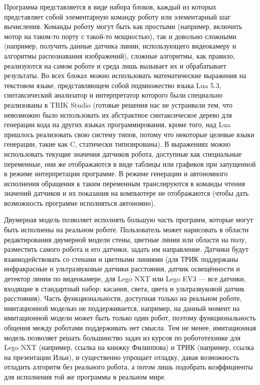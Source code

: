 ﻿\documentclass[conference]{IEEEtran}
\begin{document}
Программа представляется в виде набора блоков, каждый из которых представляет собой 
элементарную команду роботу или элементарный шаг вычисления. Команды роботу могут 
быть как простыми (например, включить мотор на таком-то порту с такой-то мощностью), 
так и довольно сложными (например, получить данные датчика линии, использующего видеокамеру 
и алгоритмы распознавания изображений), сложные алгоритмы, как правило, реализуются 
на самом роботе и среда лишь вызывает их и обрабатывает результаты. Во всех блоках 
можно использовать математические выражения на текстовом языке, представляющем собой 
подмножество языка Lua 5.3, синтаксический анализатор и интерпретатор которого были 
специально реализованы в TRIK Studio (готовые решения нас не устраивали тем, что невозможно 
было использовать их абстрактное синтаксическое дерево для генерации кода на других 
языках программирования, кроме того, над Lua пришлось реализовать свою систему типов, 
потому что некоторые целевые языки генерации, такие как C, статически типизированы). 
В выражениях можно использовать текущие значения датчиков робота, доступные как специальные 
переменные, они же отображаются в виде таблицы или графиков при запущенной в режиме 
интерпретации программе. В режиме генерации и автономного исполнения обращения к 
таким переменным транслируются в команды чтения значений датчиков и их показания на 
компьютере не отображаются (чтобы дать возможность программе исполняться автономно).

Двумерная модель позволяет исполнять большую часть программ, которые могут быть исполнены 
на реальном роботе. Пользователь может нарисовать в области редактирования двумерной 
модели стены, цветные линии или области на полу, разместить самого робота и его датчики, 
задать им направление. Датчики будут взаимодействовать со стенами и цветными линиями 
(для ТРИК поддержаны инфракрасные и ультразвуковые датчики расстояния, датчик освещённости 
и детектор линии по видеокамере, для Lego NXT или Lego EV3 --- все датчики, входящие 
в стандартный набор: касания, света, цвета и ультразвуковой датчик расстояния). Часть 
функциональности, доступная только на реальном роботе, имитационной моделью не поддерживается, 
например, на данный момент на имитационной модели может быть только один робот, поэтому 
функциональность общения между роботами поддерживать нет смысла. Тем не менее, имитационная 
модель позволяет решать большинство задач из курсов по робототехнике для Lego NXT (например, 
ссылка на книжку Филиппова) и ТРИК (например, ссылка на презентации Ильи), и существенно 
упрощает отладку, давая возможность отладить алгоритм без реального робота, а потом 
лишь подобрать коэффициенты для исполнения той же программы в реальном мире.
\end{document}
